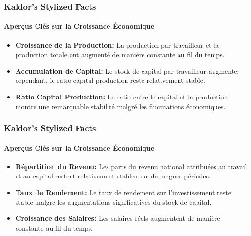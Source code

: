 \documentclass{beamer}
\begin{document}
\begin{frame}
    \frametitle{Kaldor's Stylized Facts}
    \hypertarget{kaldor}{} %
    \framesubtitle{Aperçus Clés sur la Croissance Économique}
        \begin{itemize}
            \item \textbf{Croissance de la Production:} 
            La production par travailleur et la production totale ont augmenté de 
            manière constante au fil du temps.
            \hyperlink{growth}{}
            \item \textbf{Accumulation de Capital:} 
            Le stock de capital par travailleur augmente; cependant, le ratio 
            capital-production reste relativement stable.
            \hyperlink{capital}{}
            \item \textbf{Ratio Capital-Production:}
            Le ratio entre le capital et la production 
            montre une remarquable stabilité malgré les fluctuations 
            économiques.
            \hyperlink{capital_output_ratio}{}
        \end{itemize}
\end{frame}

\begin{frame}
    \frametitle{Kaldor's Stylized Facts}
    \hypertarget{kaldor}{} %
    \framesubtitle{Aperçus Clés sur la Croissance Économique}
        \begin{itemize}
            \item \textbf{Répartition du Revenu:} 
            Les parts du revenu national attribuées au travail et au capital 
            restent relativement stables sur de longues périodes.
            \hyperlink{income}{}
            \item \textbf{Taux de Rendement:} Le taux de rendement sur l'investissement reste stable malgré les augmentations significatives du stock de capital.
            \hyperlink{return}{}
            \item \textbf{Croissance des Salaires:} 
            Les salaires réels augmentent de manière constante au fil du temps.
            \hyperlink{wages}{}
        \end{itemize}
\end{frame}

\end{document}
